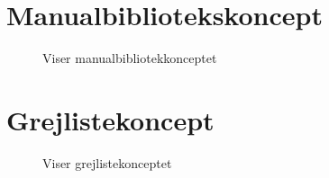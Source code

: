 \documentclass[12pt, a4paper]{article}
\begin{document}
\section{Manualbibliotekskoncept}
\begin{figure}[H]
    \centering
    \caption{Viser manualbibliotekkonceptet}
\end{figure}

\section{Grejlistekoncept}
\begin{figure}[H]
    \centering
    \caption{Viser grejlistekonceptet}
\end{figure}
\end{document}
